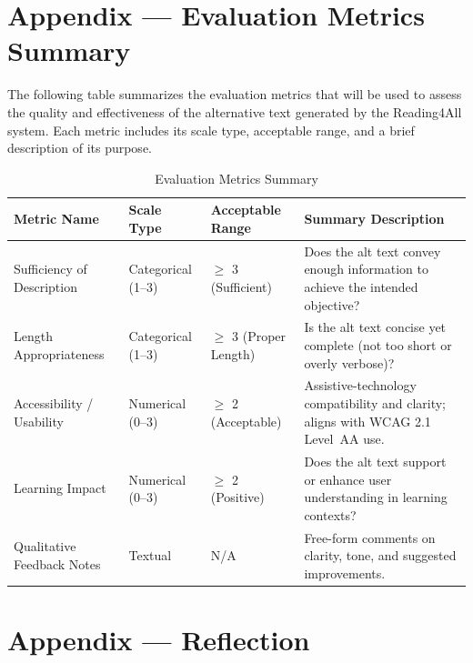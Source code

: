 \documentclass[12pt]{article}
\begin{document}
\section*{Appendix --- Evaluation Metrics Summary}
\label{sec:evaluation-metrics}
The following table summarizes the evaluation metrics that will be used to assess the quality and effectiveness of the alternative text generated by the Reading4All system. Each metric includes its scale type, acceptable range, and a brief description of its purpose.
\begin{table}[H]
    \centering
    \caption{Evaluation Metrics Summary}
    \label{tab:evaluation-metrics-summary}
    \begin{tabular}{ |p{3.5cm}|p{3cm}|p{3cm}|p{4cm}| }
      \hline
      \textbf{Metric Name} & \textbf{Scale Type} & \textbf{Acceptable Range} & \textbf{Summary Description} \\
      \hline
      Sufficiency of Description
        & Categorical (1--3)
        & $\geq$ 3 (Sufficient)
        & Does the alt text convey enough information to achieve the intended objective? \\
      \hline
      Length Appropriateness
        & Categorical (1--3)
        & $\geq$ 3 (Proper Length)
        & Is the alt text concise yet complete (not too short or overly verbose)? \\
      \hline
      Accessibility / Usability
        & Numerical (0--3)
        & $\geq$ 2 (Acceptable)
        & Assistive-technology compatibility and clarity; aligns with WCAG 2.1 Level~AA use. \\
      \hline
      Learning Impact
        & Numerical (0--3)
        & $\geq$ 2 (Positive)
        & Does the alt text support or enhance user understanding in learning contexts? \\
      \hline
      Qualitative Feedback Notes
        & Textual
        & N/A
        & Free-form comments on clarity, tone, and suggested improvements. \\
      \hline
    \end{tabular}
  \end{table}
  

\section*{Appendix --- Reflection}




\end{document}
